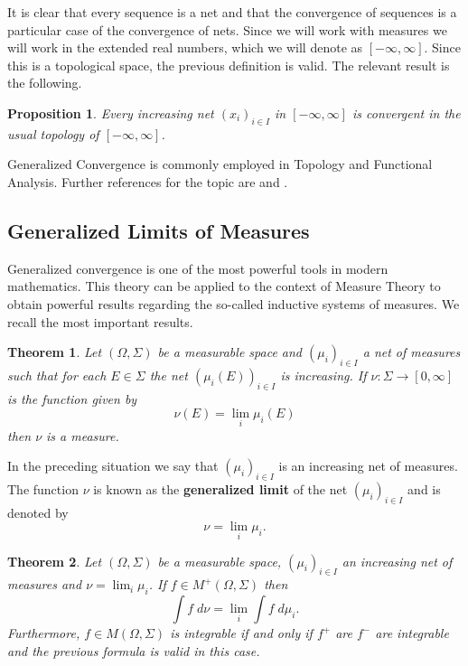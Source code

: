 \documentclass[%
 aip,
 amsmath,amssymb,
 reprint,%
jmp]{revtex4-2}
\newtheorem{theorem}{Theorem}[section]
\newtheorem{proposition}{Proposition}[section]
\begin{document}
It is clear that every sequence is a net and that the convergence of sequences is a particular case of the convergence of nets. Since we will work with measures we will work in the extended real numbers, which we will denote as $[-\infty,\infty]$. Since this is a topological space, the previous definition is valid. The relevant result is the following.

\begin{proposition}
Every increasing net $(x_{i})_{i\in I}$ in $[-\infty,\infty]$ is convergent in the usual topology of $[-\infty,\infty]$.
\end{proposition}

Generalized Convergence is commonly employed in Topology and Functional Analysis. Further references for the topic are \cite{Megginson} and \cite{Dugundji}.

\subsection{Generalized Limits of Measures}

Generalized convergence is one of the most powerful tools in modern mathematics. This theory can be applied to the context of Measure Theory to obtain powerful results regarding the so-called inductive systems of measures. We recall the most important results.

\begin{theorem}
Let $(\Omega,\Sigma)$ be a measurable space and $(\mu_{i})_{i\in I}$ a net of measures such that for each $E\in\Sigma$ the net $(\mu_{i}(E))_{i\in I}$ is increasing. If $\nu\colon\Sigma \to [0,\infty]$ is the function given by
\begin{equation*}
    \nu(E) = \lim_{i} \mu_{i}(E)
\end{equation*}
then $\nu$ is a measure.
\end{theorem}

In the preceding situation we say that $(\mu_{i})_{i\in I}$ is an increasing net of measures. The function $\nu$ is known as the \textbf{generalized limit} of the net $(\mu_{i})_{i\in I}$ and is denoted by
\begin{equation*}
    \nu = \lim_{i}\mu_{i}.
\end{equation*}

\begin{theorem}
Let $(\Omega,\Sigma)$ be a measurable space, $(\mu_{i})_{i\in I}$ an increasing net of measures and $\nu = \lim_{i}\mu_{i}$. If $f\in M^{+}(\Omega,\Sigma)$ then
\begin{equation*}
    \int f\;d\nu = \lim_{i}\int f\;d\mu_{i}.
\end{equation*}
Furthermore, $f\in M(\Omega,\Sigma)$ is integrable if and only if $f^{+}$ are $f^{-}$ are integrable and the previous formula is valid in this case.
\end{theorem}
\end{document}
